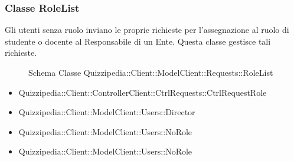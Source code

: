 \subsubsection{Classe RoleList}
Gli utenti senza ruolo inviano le proprie richieste per l'assegnazione al ruolo di studente o docente al Responsabile di un Ente. Questa classe gestisce tali richieste.
\begin{figure}[H]
\centering
\noindent{}
\caption{Schema Classe Quizzipedia::Client::ModelClient::Requests::RoleList}
\end{figure}
\begin{itemize}
\item Quizzipedia::Client::ControllerClient::CtrlRequests::CtrlRequestRole
\item Quizzipedia::Client::ModelClient::Users::Director
\item Quizzipedia::Client::ModelClient::Users::NoRole
\end{itemize}
\begin{itemize}
\item Quizzipedia::Client::ModelClient::Users::NoRole
\end{itemize}
